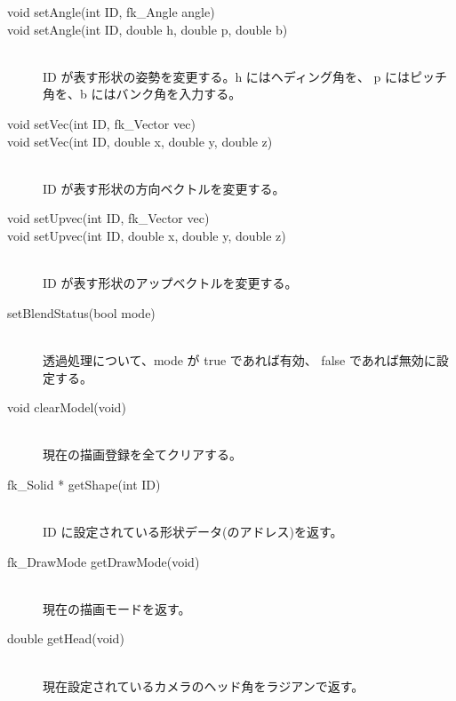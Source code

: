 \begin{description}
 \item[\hspace*{0.6cm}void setAngle(int ID, fk\_Angle angle)]
 \item[\hspace*{0.6cm}
	void setAngle(int ID, double h, double p, double b)] ~ \\
	ID が表す形状の姿勢を変更する。h にはヘディング角を、
	p にはピッチ角を、b にはバンク角を入力する。

 \item[\hspace*{0.6cm}void setVec(int ID, fk\_Vector vec)]
 \item[\hspace*{0.6cm} void setVec(int ID, double x, double y, double z)] ~ \\
	ID が表す形状の方向ベクトルを変更する。

 \item[\hspace*{0.6cm}void setUpvec(int ID, fk\_Vector vec)]
 \item[\hspace*{0.6cm}void setUpvec(int ID, double x, double y, double z)] ~ \\
	ID が表す形状のアップベクトルを変更する。

 \item[\hspace*{0.6cm}setBlendStatus(bool mode)] ~ \\
	透過処理について、mode が true であれば有効、
	false であれば無効に設定する。

 \item[\hspace*{0.6cm}void clearModel(void)] ~ \\
	現在の描画登録を全てクリアする。

 \item[\hspace*{0.6cm}fk\_Solid * getShape(int ID)] ~ \\
	ID に設定されている形状データ(のアドレス)を返す。

 \item[\hspace*{0.6cm}fk\_DrawMode getDrawMode(void)] ~ \\
	現在の描画モードを返す。

 \item[\hspace*{0.6cm}double getHead(void)] ~ \\
	現在設定されているカメラのヘッド角をラジアンで返す。


\end{description}
